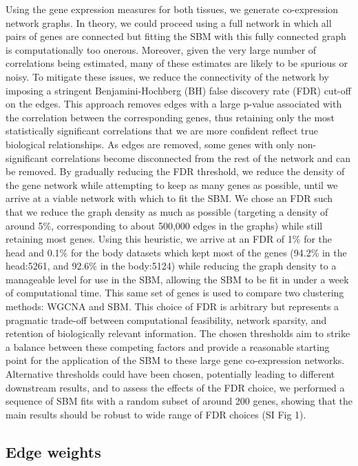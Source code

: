 \documentclass[
]{article}
\begin{document}
Using the gene expression measures for both tissues, we generate
co-expression network graphs. In theory, we could proceed using a full
network in which all pairs of genes are connected but fitting the SBM
with this fully connected graph is computationally too onerous.
Moreover, given the very large number of correlations being estimated,
many of these estimates are likely to be spurious or noisy. To mitigate
these issues, we reduce the connectivity of the network by imposing a
stringent Benjamini-Hochberg (BH) false discovery rate (FDR) cut-off on
the edges. This approach removes edges with a large p-value associated
with the correlation between the corresponding genes, thus retaining
only the most statistically significant correlations that we are more
confident reflect true biological relationships. As edges are removed,
some genes with only non-significant correlations become disconnected
from the rest of the network and can be removed. By gradually reducing
the FDR threshold, we reduce the density of the gene network while
attempting to keep as many genes as possible, until we arrive at a
viable network with which to fit the SBM. We chose an FDR such that we
reduce the graph density as much as possible (targeting a density of
around 5\%, corresponding to about 500,000 edges in the graphs) while
still retaining most genes. Using this heuristic, we arrive at an FDR of
1\% for the head and 0.1\% for the body datasets which kept most of the
genes (94.2\% in the head:5261, and 92.6\% in the body:5124) while
reducing the graph density to a manageable level for use in the SBM,
allowing the SBM to be fit in under a week of computational time. This
same set of genes is used to compare two clustering methods: WGCNA and
SBM. This choice of FDR is arbitrary but represents a pragmatic
trade-off between computational feasibility, network sparsity, and
retention of biologically relevant information. The chosen thresholds
aim to strike a balance between these competing factors and provide a
reasonable starting point for the application of the SBM to these large
gene co-expression networks. Alternative thresholds could have been
chosen, potentially leading to different downstream results, and to
assess the effects of the FDR choice, we performed a sequence of SBM
fits with a random subset of around 200 genes, showing that the main
results should be robust to wide range of FDR choices (SI Fig 1).

\subsection{Edge weights}\label{edge-weights}
\end{document}
